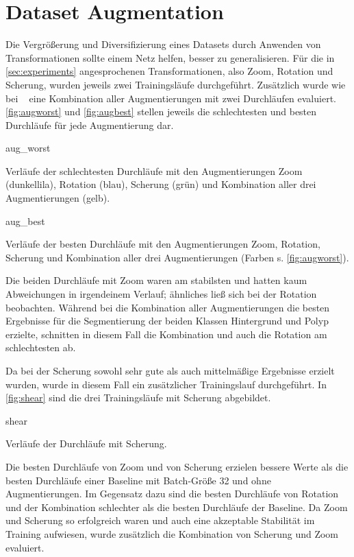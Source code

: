 \section{Dataset Augmentation}

Die Vergrößerung und Diversifizierung eines Datasets durch Anwenden von Transformationen sollte einem Netz helfen, besser zu generalisieren.
Für die in \autoref{sec:experiments} angesprochenen Transformationen, also Zoom, Rotation und Scherung, wurden jeweils zwei Trainingsläufe durchgeführt.
Zusätzlich wurde wie bei ~\cite{Vazquez.2017} eine Kombination aller Augmentierungen mit zwei Durchläufen evaluiert.
\autoref{fig:augworst} und \autoref{fig:augbest} stellen jeweils die schlechtesten und besten Durchläufe für jede Augmentierung dar.

\begin{losses}{aug_worst}
	\caption{Verläufe der schlechtesten Durchläufe mit den Augmentierungen Zoom (dunkellila), Rotation (blau), Scherung (grün) und Kombination aller drei Augmentierungen (gelb).}
	\label{fig:augworst}
\end{losses}

\begin{losses}{aug_best}
	\caption{Verläufe der besten Durchläufe mit den Augmentierungen Zoom, Rotation, Scherung und Kombination aller drei Augmentierungen (Farben s. \autoref{fig:augworst}).}
	\label{fig:augbest}
\end{losses}

Die beiden Durchläufe mit Zoom waren am stabilsten und hatten kaum Abweichungen in irgendeinem Verlauf; ähnliches ließ sich bei der Rotation beobachten.
Während bei \cite{Vazquez.2017} die Kombination aller Augmentierungen die besten Ergebnisse für die Segmentierung der beiden Klassen Hintergrund und Polyp erzielte, schnitten in diesem Fall die Kombination und auch die Rotation am schlechtesten ab.

Da bei der Scherung sowohl sehr gute als auch mittelmäßige Ergebnisse erzielt wurden, wurde in diesem Fall ein zusätzlicher Trainingslauf durchgeführt.
In \autoref{fig:shear} sind die drei Trainingsläufe mit Scherung abgebildet.

\begin{losses}{shear}
	\caption{Verläufe der Durchläufe mit Scherung.}
	\label{fig:shear}
\end{losses}

Die besten Durchläufe von Zoom und von Scherung erzielen bessere Werte als die besten Durchläufe einer Baseline mit Batch-Größe 32 und ohne Augmentierungen.
Im Gegensatz dazu sind die besten Durchläufe von Rotation und der Kombination schlechter als die besten Durchläufe der Baseline.
Da Zoom und Scherung so erfolgreich waren und auch eine akzeptable Stabilität im Training aufwiesen, wurde zusätzlich die Kombination von Scherung und Zoom evaluiert.



